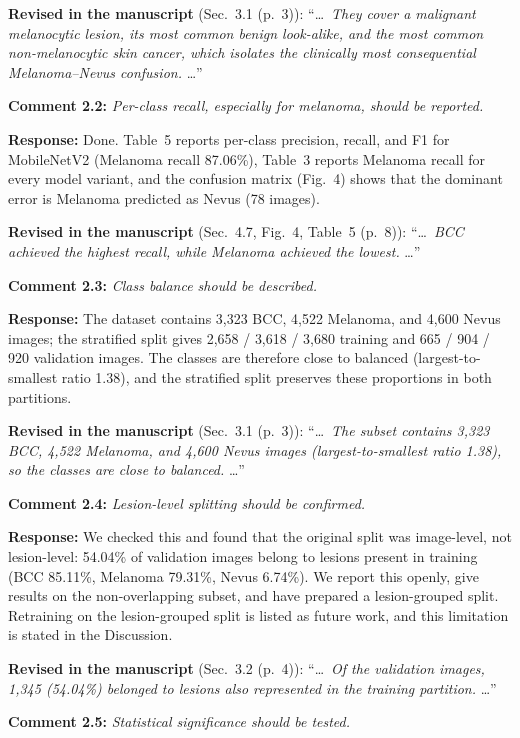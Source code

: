 \documentclass[11pt,a4paper]{article}
\begin{document}
\textbf{Revised in the manuscript} (Sec.~3.1 (p.~3)): ``\ldots\ \emph{They cover a malignant melanocytic lesion, its most common benign look-alike, and the most common non-melanocytic skin cancer, which isolates the clinically most consequential Melanoma--Nevus confusion.} \ldots''

\medskip
\textbf{Comment 2.2:} \emph{Per-class recall, especially for melanoma, should be reported.}

\textbf{Response:} Done. Table~5 reports per-class precision, recall, and F1 for MobileNetV2 (Melanoma recall 87.06\%), Table~3 reports Melanoma recall for every model variant, and the confusion matrix (Fig.~4) shows that the dominant error is Melanoma predicted as Nevus (78 images).

\textbf{Revised in the manuscript} (Sec.~4.7, Fig.~4, Table~5 (p.~8)): ``\ldots\ \emph{BCC achieved the highest recall, while Melanoma achieved the lowest.} \ldots''

\medskip
\textbf{Comment 2.3:} \emph{Class balance should be described.}

\textbf{Response:} The dataset contains 3,323 BCC, 4,522 Melanoma, and 4,600 Nevus images; the stratified split gives 2,658 / 3,618 / 3,680 training and 665 / 904 / 920 validation images. The classes are therefore close to balanced (largest-to-smallest ratio 1.38), and the stratified split preserves these proportions in both partitions.

\textbf{Revised in the manuscript} (Sec.~3.1 (p.~3)): ``\ldots\ \emph{The subset contains 3,323 BCC, 4,522 Melanoma, and 4,600 Nevus images (largest-to-smallest ratio 1.38), so the classes are close to balanced.} \ldots''

\medskip
\textbf{Comment 2.4:} \emph{Lesion-level splitting should be confirmed.}

\textbf{Response:} We checked this and found that the original split was image-level, not lesion-level: 54.04\% of validation images belong to lesions present in training (BCC 85.11\%, Melanoma 79.31\%, Nevus 6.74\%). We report this openly, give results on the non-overlapping subset, and have prepared a lesion-grouped split. Retraining on the lesion-grouped split is listed as future work, and this limitation is stated in the Discussion.

\textbf{Revised in the manuscript} (Sec.~3.2 (p.~4)): ``\ldots\ \emph{Of the validation images, 1,345 (54.04\%) belonged to lesions also represented in the training partition.} \ldots''

\medskip
\textbf{Comment 2.5:} \emph{Statistical significance should be tested.}
\end{document}
